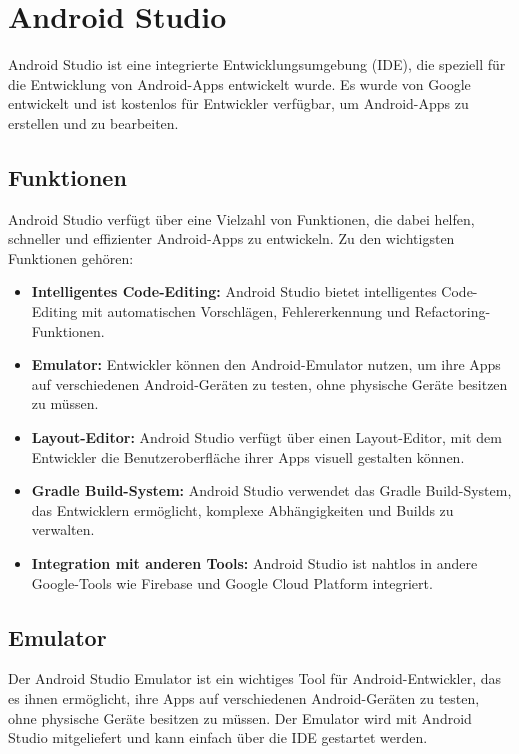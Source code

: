     \section{Android Studio}
    Android Studio \cite{AndroidRuntimeChanges} ist eine integrierte Entwicklungsumgebung (IDE), die speziell für die Entwicklung von Android-Apps entwickelt wurde. 
    Es wurde von Google entwickelt und ist kostenlos für Entwickler verfügbar, um Android-Apps zu erstellen und zu bearbeiten.

    \subsection{Funktionen}
    Android Studio verfügt über eine Vielzahl von Funktionen, die dabei helfen, schneller und effizienter Android-Apps zu entwickeln. Zu den wichtigsten Funktionen gehören:

    \begin{itemize}
        \item \textbf{Intelligentes Code-Editing:} Android Studio bietet intelligentes Code-Editing mit automatischen Vorschlägen, Fehlererkennung und Refactoring-Funktionen.
        \item \textbf{Emulator:} Entwickler können den Android-Emulator nutzen, um ihre Apps auf verschiedenen Android-Geräten zu testen, ohne physische Geräte besitzen zu müssen.
        \item \textbf{Layout-Editor:} Android Studio verfügt über einen Layout-Editor, mit dem Entwickler die Benutzeroberfläche ihrer Apps visuell gestalten können.
        \item \textbf{Gradle Build-System:} Android Studio verwendet das Gradle Build-System, das Entwicklern ermöglicht, komplexe Abhängigkeiten und Builds zu verwalten.
        \item \textbf{Integration mit anderen Tools:} Android Studio ist nahtlos in andere Google-Tools wie Firebase und Google Cloud Platform integriert.
        \end{itemize}

    \subsection{Emulator}
    Der Android Studio Emulator \cite{AndroidEmulator} ist ein wichtiges Tool für Android-Entwickler, das es ihnen ermöglicht, ihre Apps auf verschiedenen Android-Geräten zu testen, ohne physische Geräte besitzen zu müssen. Der Emulator wird mit Android Studio mitgeliefert und kann einfach über die IDE gestartet werden.

